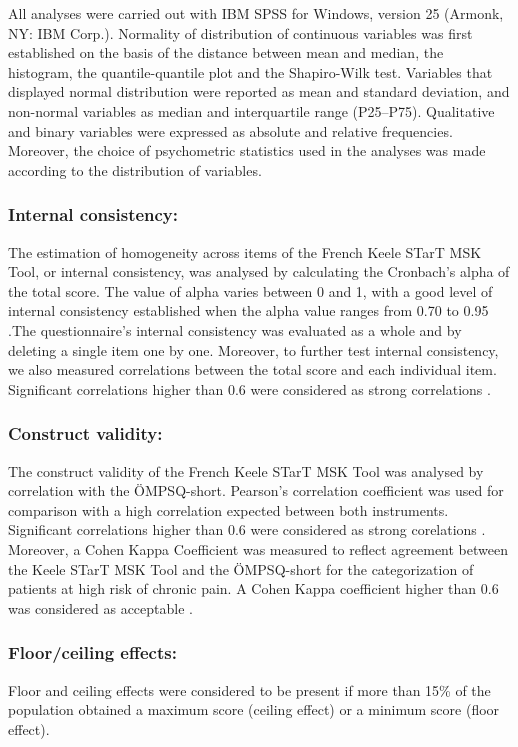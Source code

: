 All analyses were carried out with IBM SPSS for Windows, version 25 (Armonk, NY: IBM Corp.). Normality of distribution of continuous variables was first established on the basis of the distance between mean and median, the histogram, the quantile-quantile plot and the Shapiro-Wilk test. Variables that displayed normal distribution were reported as mean and standard deviation, and non-normal variables as median and interquartile range (P25–P75). Qualitative and binary variables were expressed as absolute and relative frequencies. Moreover, the choice of psychometric statistics used in the analyses was made according to the distribution of variables. 

\subsubsection{Internal consistency: }
The estimation of homogeneity across items of the French Keele STarT MSK Tool, or internal consistency, was analysed by calculating the Cronbach’s alpha of the total score. The value of alpha varies between 0 and 1, with a good level of internal consistency established when the alpha value ranges from 0.70 to 0.95 \citep{de2011measurement}.The questionnaire’s internal consistency was evaluated as a whole and by deleting a single item one by one. Moreover, to further test internal consistency, we also measured correlations between the total score and each individual item. Significant correlations higher than 0.6 were considered as strong correlations \citep{deyo1991reproducibility}. 

\subsubsection{Construct validity: }
The construct validity of the French Keele STarT MSK Tool was analysed by correlation with the ÖMPSQ-short. Pearson’s correlation coefficient was used for comparison with a high correlation expected between both instruments. Significant correlations higher than 0.6 were considered as strong corelations \citep{deyo1991reproducibility}. Moreover, a Cohen Kappa Coefficient was measured to reflect agreement between the Keele STarT MSK Tool and the ÖMPSQ-short for the categorization of patients at high risk of chronic pain. A Cohen Kappa coefficient higher than 0.6 was considered as acceptable \citep{mchugh2012interrater}. 

\subsubsection{Floor/ceiling effects: }
Floor and ceiling effects were considered to be present if more than 15\% of the population obtained a maximum score (ceiling effect) or a minimum score (floor effect). 

